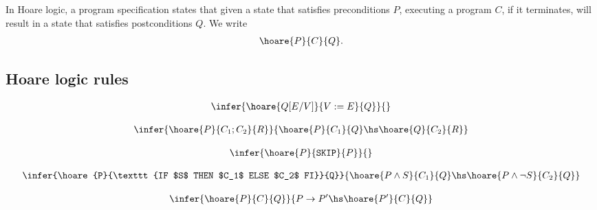 \documentclass{article}
\begin{document}
\begin{definition}
    In Hoare logic, a program specification states that 
    given a state that satisfies preconditions $P$, executing a program $C$, if it terminates, 
    will result in a state that satisfies postconditions $Q$. We write 
    \begin{align*}
        \hoare{P}{C}{Q}.
    \end{align*}
\end{definition}

\subsection{Hoare logic rules}

\begin{definition}
    \begin{align*}
        \infer{\hoare{Q[E/V]}{V:=E}{Q}}{}
    \end{align*} 
\end{definition}

\begin{definition}
   \begin{align*}
       \infer{\hoare{P}{C_1; C_2}{R}}{\hoare{P}{C_1}{Q} \hs \hoare{Q}{C_2}{R}}
   \end{align*} 
\end{definition}

\begin{definition}
   \begin{align*}
        \infer{\hoare{P}{\texttt{SKIP}}{P}}{} 
   \end{align*} 
\end{definition}

\begin{definition}
    \begin{align*}
        \infer{\hoare{P}{\texttt{IF $S$ THEN $C_1$ ELSE $C_2$ FI}}{Q}}{
            \hoare{P\wedge S}{C_1}{Q}\hs\hoare{P\wedge\neg S}{C_2}{Q}
        } 
    \end{align*}    
\end{definition}

\begin{definition}
    \begin{align*}
        \infer{\hoare{P}{C}{Q}}{P\to P'\hs\hoare{P'}{C}{Q}}
    \end{align*} 
\end{definition}
\end{document}
